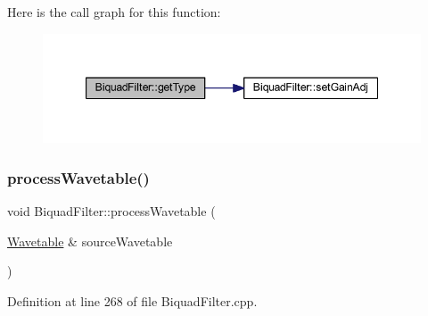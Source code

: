 Here is the call graph for this function\+:
\nopagebreak
\begin{figure}[H]
\begin{center}
\leavevmode
\includegraphics[width=347pt]{class_biquad_filter_ad77052398310ede2df2ba664259317d9_cgraph}
\end{center}
\end{figure}
\mbox{\label{class_biquad_filter_a205ea1f856a52f5d369d45cf385df801}} 
\subsubsection{\texorpdfstring{process\+Wavetable()}{processWavetable()}}
{\footnotesize\ttfamily void Biquad\+Filter\+::process\+Wavetable (\begin{DoxyParamCaption}\item[{\hyperlink{class_wavetable}{Wavetable} \&}]{source\+Wavetable }\end{DoxyParamCaption})}



Definition at line 268 of file Biquad\+Filter.\+cpp.

